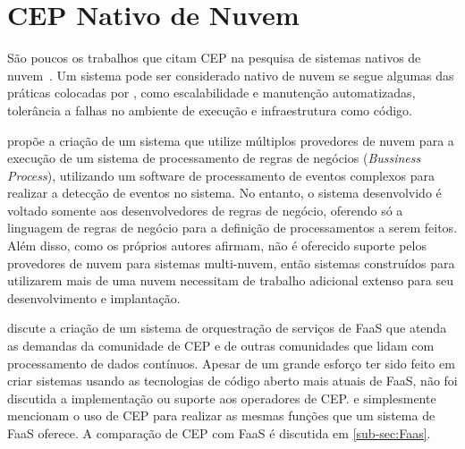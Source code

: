



\section{CEP Nativo de Nuvem}





São poucos os trabalhos que citam CEP na pesquisa de sistemas nativos de nuvem~\citep{10.1145/2830013.2830016,10.1145/3401025.3401731,kritikos2019multi,10.1007/978-3-662-44879-3_7}. 
Um sistema pode ser considerado nativo de nuvem se segue algumas das práticas colocadas por \cite{garrison2017cloud}, como escalabilidade e manutenção automatizadas, tolerância a falhas no ambiente de execução e infraestrutura como código.




\cite{kritikos2019multi} propõe a criação de um sistema que utilize múltiplos provedores de nuvem para a execução de um sistema de processamento de regras de negócios (\textit{Bussiness Process}), utilizando um software de processamento de eventos complexos para realizar a detecção de eventos no sistema. No entanto, o sistema desenvolvido é voltado somente aos desenvolvedores de regras de negócio, oferendo só a linguagem de regras de negócio para a definição de processamentos a serem feitos. Além disso, como os próprios autores afirmam, não é oferecido suporte pelos provedores de nuvem para sistemas multi-nuvem, então sistemas construídos para utilizarem mais de uma nuvem necessitam de trabalho adicional extenso para seu desenvolvimento e implantação.


\cite{10.1145/3401025.3401731} discute a criação de um sistema de orquestração de serviços de FaaS que atenda as demandas da comunidade de CEP e de outras comunidades que lidam com processamento de dados contínuos. Apesar de um grande esforço ter sido feito em criar sistemas usando as tecnologias de código aberto mais atuais de FaaS, não foi discutida a implementação ou suporte aos operadores de CEP. \cite{10.1145/2830013.2830016} e \cite{10.1007/978-3-662-44879-3_7} simplesmente mencionam o uso de CEP para realizar as mesmas funções que um sistema de FaaS oferece. A comparação de CEP com FaaS é discutida em \autoref{sub-sec:Faas}.





